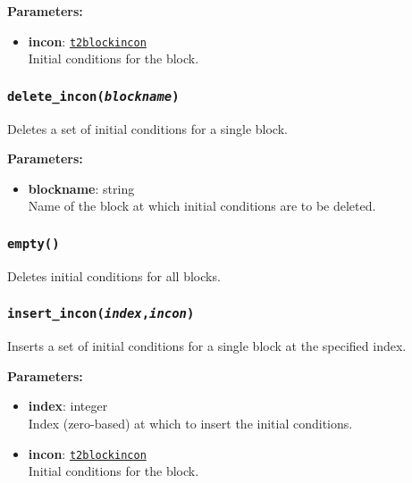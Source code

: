 \textbf{Parameters:}
\begin{itemize}
\item \textbf{incon}: \hyperref[t2blockincons]{\texttt{t2blockincon}}\\
  Initial conditions for the block.
\end{itemize}

\begin{snugshade}
\subsubsection{\texttt{delete\_incon(\emph{blockname})}}
\end{snugshade}
\label{sec:t2incon:delete_incon}

Deletes a set of initial conditions for a single block.

\textbf{Parameters:}
\begin{itemize}
\item \textbf{blockname}: string\\
  Name of the block at which initial conditions are to be deleted.
\end{itemize}

\begin{snugshade}
\subsubsection{\texttt{empty()}}
\end{snugshade}
\label{sec:t2incon:empty}

Deletes initial conditions for all blocks.

\begin{snugshade}
\subsubsection{\texttt{insert\_incon(\emph{index},\emph{incon})}}
\end{snugshade}
\label{sec:t2incon:insert_incon}

Inserts a set of initial conditions for a single block at the specified index.

\textbf{Parameters:}
\begin{itemize}
\item \textbf{index}: integer\\
  Index (zero-based) at which to insert the initial conditions.
\item \textbf{incon}: \hyperref[t2blockincons]{\texttt{t2blockincon}}\\
  Initial conditions for the block.
\end{itemize}

